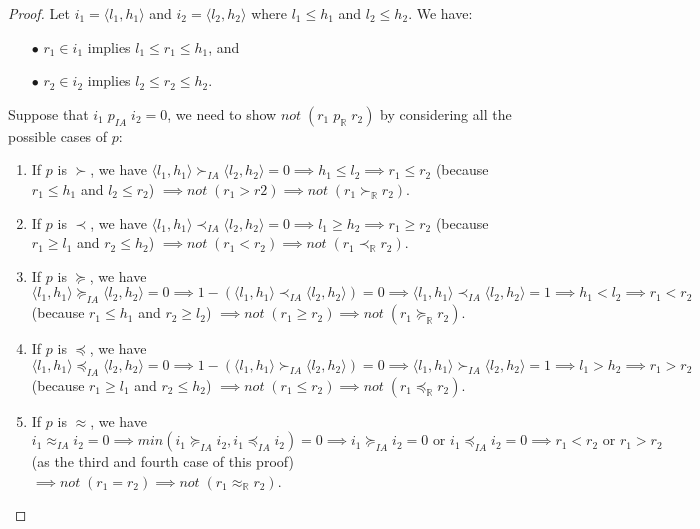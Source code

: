 \begin{proof}
Let $i_1 = \langle l_1, h_1\rangle $ and $i_2 = \langle l_2, h_2\rangle $ where $l_1 \le h_1$ and $l_2 \le h_2$. We have: 
\begin{itemize}
\item[$\bullet$] $r_1 \in i_1$ implies $l_1 \le r_1 \le h_1$, and
\item[$\bullet$] $r_2 \in i_2$ implies $l_2 \le r_2 \le h_2$.
\end{itemize}
Suppose  that $i_1 \; p_{IA} \; i_2 = 0 $, we need to show $not \; (r_1 \; p_\mathbb{R} \; r_2)$ by considering all the possible cases of $p$:
\begin{enumerate}
\item If $p$ is $\succ$, we have $\langle l_1, h_1\rangle  \succ_{IA} \langle l_2, h_2\rangle  = 0  \implies h_1 \le l_2 \implies r_1 \le r_2$ (because $r_1 \le h_1$ and $l_2 \le r_2$) $\implies not \; (r_1 > r2) \implies not \; (r_1 \succ_\mathbb{R} r_2)$.
\item If $p$ is $\prec$, we have $\langle l_1, h_1\rangle  \prec_{IA} \langle l_2, h_2\rangle  = 0  \implies l_1 \ge h_2 \implies r_1 \ge r_2$ (because $r_1 \ge l_1$ and $r_2 \le h_2$) $\implies not \; (r_1 < r_2) \implies not \; (r_1 \prec_\mathbb{R} r_2)$.
\item If $p$ is $\succeq$, we have $\langle l_1, h_1\rangle  \succeq_{IA} \langle l_2, h_2\rangle  = 0  \implies {1 -  (\langle l_1, h_1\rangle  \prec_{IA} \langle l_2, h_2\rangle ) = 0}  \implies \langle l_1, h_1\rangle  \prec_{IA} \langle l_2, h_2\rangle  = 1 \implies h_1 < l_2 \implies r_1 < r_2$ (because $r_1 \le h_1$ and $r_2 \ge l_2$) $\implies not \; (r_1 \ge r_2) \implies not \; (r_1 \succeq_\mathbb{R} r_2)$.
\item If $p$ is $\preceq$, we have $\langle l_1, h_1\rangle  \preceq_{IA} \langle l_2, h_2\rangle  = 0  \implies {1 - (\langle l_1, h_1\rangle  \succ_{IA} \langle l_2, h_2\rangle ) = 0}  \implies \langle l_1, h_1\rangle  \succ_{IA} \langle l_2, h_2\rangle  = 1 \implies l_1 > h	_2 \implies r_1 > r_2$ (because $r_1 \ge l_1$ and $r_2 \le h_2$) $\implies not \; (r_1 \le r_2) \implies not \; (r_1 \preceq_\mathbb{R} r_2)$.
\item If $p$ is $\approx$, we have $i_1 \approx_{IA} i_2 = 0  \implies min(i_1 \succeq_{IA} i_2 , i_1 \preceq_{IA} i_2) = 0  \implies {i_1 \succeq_{IA} i_2 = 0}  \text{ or } i_1 \preceq_{IA} i_2 = 0  \implies r_1 < r_2 \text{ or } r_1 > r_2$ (as the third and fourth case of this proof) $\implies not \; (r_1 = r_2) \implies not \; (r_1 \approx_\mathbb{R} r_2)$.

\end{enumerate}
\end{proof}
